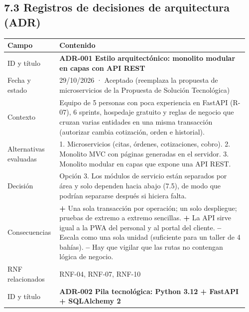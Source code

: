 
\subsection{7.3 Registros de decisiones de arquitectura
(ADR)}\label{registros-de-decisiones-de-arquitectura-adr}

{\small
\begin{longtable}{@{}L{0.2\linewidth}L{0.76\linewidth}@{}}
\toprule
\textbf{Campo} & \textbf{Contenido} \\
\midrule
\endhead
\bottomrule
\endlastfoot
ID y título & \textbf{ADR-001 Estilo arquitectónico: monolito modular en capas con API REST} \\
Fecha y estado & 29/10/2026 · Aceptado (reemplaza la propuesta de microservicios de la Propuesta de
Solución Tecnológica) \\
Contexto & Equipo de 5 personas con poca experiencia en FastAPI (R-07), 6 sprints, hospedaje gratuito y
reglas de negocio que cruzan varias entidades en una misma transacción (autorizar cambia cotización,
orden e historial). \\
Alternativas evaluadas & 1. Microservicios (citas, órdenes, cotizaciones, cobro). 2. Monolito MVC con
páginas generadas en el servidor. 3. Monolito modular en capas que expone una API REST. \\
Decisión & Opción 3. Los módulos de servicio están separados por área y solo dependen hacia abajo
(7.5), de modo que podrían separarse después si hiciera falta. \\
Consecuencias & \textbf{+} Una sola transacción por operación; un solo despliegue; pruebas de extremo a
extremo sencillas. \textbf{+} La API sirve igual a la PWA del personal y al portal del cliente.
\textbf{--} Escala como una sola unidad (suficiente para un taller de 4 bahías). \textbf{--} Hay que vigilar
que las rutas no contengan lógica de negocio. \\
RNF relacionados & RNF-04, RNF-07, RNF-10 \\
\midrule
ID y título & \textbf{ADR-002 Pila tecnológica: Python 3.12 + FastAPI + SQLAlchemy 2} \\

\end{longtable}}
